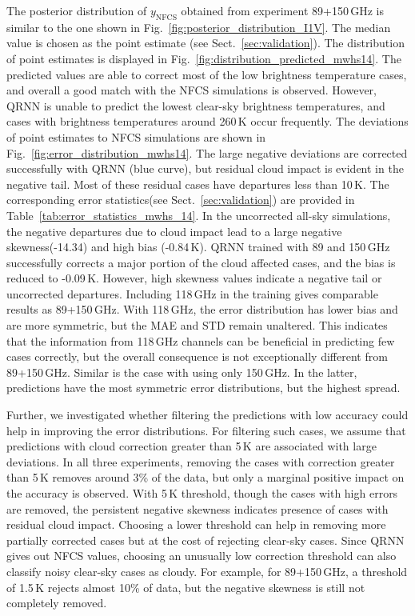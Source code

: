 \documentclass[amt, manuscript]{copernicus}
\newcommand{\ynfcs}{y_\text{NFCS}}
\begin{document}
The posterior distribution of $\ynfcs$ obtained from experiment 89+150\,GHz is similar to the one shown in Fig.~\ref{fig:posterior_distribution_I1V}. The median value is chosen as the point estimate (see Sect.~\ref{sec:validation}). The distribution of point estimates is displayed in Fig.~\ref{fig:distribution_predicted_mwhs14}. The predicted values are able to correct most of the low brightness temperature cases, and overall a good match with the NFCS simulations is observed. However, QRNN is unable to predict the lowest clear-sky brightness temperatures, and cases with brightness temperatures around 260\,K occur frequently. The deviations of point estimates to NFCS simulations are shown in Fig.~\ref{fig:error_distribution_mwhs14}. The large negative deviations are corrected successfully with QRNN (blue curve), but residual cloud impact is evident in the negative tail. Most of these residual cases have departures less than 10\,K. The corresponding error statistics(see Sect.~\ref{sec:validation}) are provided in  Table~\ref{tab:error_statistics_mwhs_14}. In the uncorrected all-sky simulations, the negative departures due to cloud impact lead to a large negative skewness(-14.34) and high bias (-0.84\,K). QRNN trained with 89 and 150\,GHz successfully corrects a major portion of the cloud affected cases, and the bias is reduced to -0.09\,K. However, high skewness values indicate a negative tail or uncorrected departures. Including 118\,GHz in the training gives comparable results as 89+150\,GHz. With 118\,GHz, the error distribution has lower bias and are more symmetric, but the MAE and STD remain unaltered. This indicates that the information from 118\,GHz channels can be beneficial in predicting few cases correctly, but the overall consequence is not exceptionally different from 89+150\,GHz. Similar is the case with using only 150\,GHz. In the latter, predictions have the most symmetric error distributions, but the highest spread. 

Further, we investigated whether filtering the predictions with low accuracy could help in improving the error distributions. For filtering such cases, we assume that predictions with cloud correction greater than 5\,K are associated with large deviations. In all three experiments, removing the cases with correction greater than 5\,K removes around 3\% of the data, but only a marginal positive impact on the accuracy is observed. With 5\,K threshold, though the cases with high errors are removed, the persistent negative skewness indicates presence of cases with residual cloud impact. Choosing a lower threshold can help in removing more partially corrected cases but at the cost of rejecting clear-sky cases. Since QRNN gives out NFCS values, choosing an unusually low correction threshold can also classify noisy clear-sky cases as cloudy. For example, for 89+150\,GHz, a threshold of 1.5\,K rejects almost 10\% of data, but the negative skewness is still not completely removed. 
\end{document}
